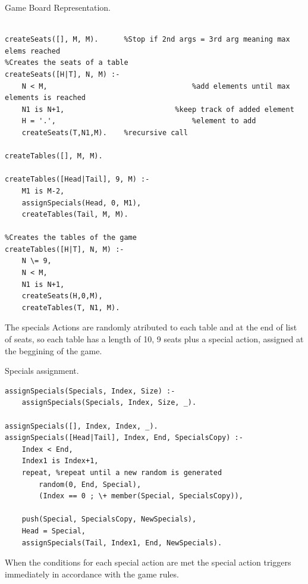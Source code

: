 \documentclass[a4paper]{article}
\begin{document}
\begin{listing}[H]
    \caption{Game Board Representation.}
    \label{Codigo:cod_board}
    \begin{verbatim}

createSeats([], M, M).      %Stop if 2nd args = 3rd arg meaning max elems reached
%Creates the seats of a table
createSeats([H|T], N, M) :-
    N < M,                                  %add elements until max elements is reached
    N1 is N+1,                          %keep track of added element
    H = '.',                                %element to add
    createSeats(T,N1,M).    %recursive call

createTables([], M, M).

createTables([Head|Tail], 9, M) :-
    M1 is M-2,
    assignSpecials(Head, 0, M1),
    createTables(Tail, M, M).

%Creates the tables of the game
createTables([H|T], N, M) :-
    N \= 9,
    N < M,
    N1 is N+1,
    createSeats(H,0,M),
    createTables(T, N1, M).

\end{verbatim}

\end{listing}
\newpage
The specials Actions are randomly atributed to each table and at the end of list of seats, so each table
has a length of 10, 9 seats plus a special action, assigned at the beggining of the game.

\renewcommand\listingscaption{Code}

\begin{listing}[H]
    \caption{Specials assignment.}
    \label{Codigo:cod_special}
    \begin{verbatim}
assignSpecials(Specials, Index, Size) :-
    assignSpecials(Specials, Index, Size, _).

assignSpecials([], Index, Index, _).
assignSpecials([Head|Tail], Index, End, SpecialsCopy) :-
    Index < End,
    Index1 is Index+1,
    repeat, %repeat until a new random is generated
        random(0, End, Special),
        (Index == 0 ; \+ member(Special, SpecialsCopy)),

    push(Special, SpecialsCopy, NewSpecials),
    Head = Special,
    assignSpecials(Tail, Index1, End, NewSpecials).

\end{verbatim}

\end{listing}

When the conditions for each special action are met the special action triggers immediately in accordance with the game rules.
\end{document}
